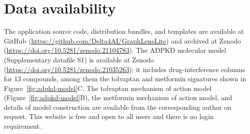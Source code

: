 \section{Data availability}
The application source code, distribution bundles, and templates are available at GitHub (\url{https://github.com/Delta4AI/GraphLensLite}) and archived at Zenodo (\url{https://doi.org/10.5281/zenodo.21104783}). The ADPKD molecular model (Supplementary datafile S1) is available at Zenodo (\url{https://doi.org/10.5281/zenodo.21035263}); it includes drug-interference columns for 13 compounds, among them the tolvaptan and metformin signatures shown in Figure~\ref{fig:adpkd-model}C. The tolvaptan mechanism of action model (Figure~\ref{fig:adpkd-model}B), the metformin mechanism of action model, and details of model construction are available from the corresponding author on request. This website is free and open to all users and there is no login requirement.
